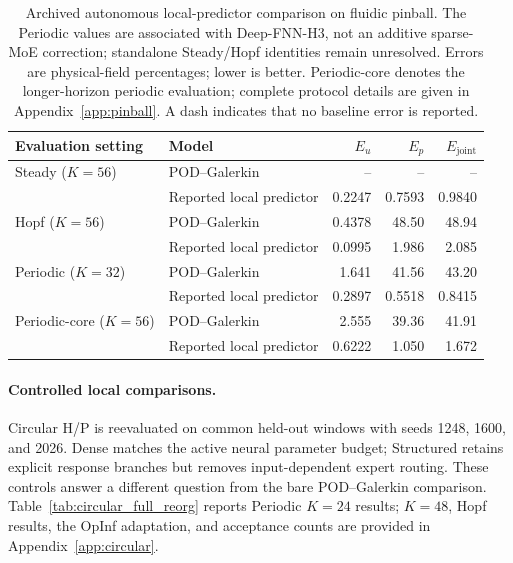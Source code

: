 \begin{table}[H]
\centering
\caption{
Archived autonomous local-predictor comparison on fluidic pinball. The Periodic values are associated with Deep-FNN-H3, not an additive sparse-MoE correction; standalone Steady/Hopf identities remain unresolved. Errors are physical-field percentages; lower is better. Periodic-core denotes the longer-horizon periodic evaluation; complete protocol details are given in Appendix~\ref{app:pinball}. A dash indicates that no baseline error is reported.
}
\label{tab:pinball_autonomous}
\small
\setlength{\tabcolsep}{5pt}
\begin{tabular}{@{}llrrr@{}}
\toprule
Evaluation setting & Model & $E_u$ & $E_p$ & $E_{\mathrm{joint}}$ \\
\midrule
Steady ($K=56$)
& POD--Galerkin
& -- & -- & -- \\
& Reported local predictor
& 0.2247 & 0.7593 & 0.9840 \\
\addlinespace

Hopf ($K=56$)
& POD--Galerkin
& 0.4378 & 48.50 & 48.94 \\
& Reported local predictor
& 0.0995 & 1.986 & 2.085 \\
\addlinespace

Periodic ($K=32$)
& POD--Galerkin
& 1.641 & 41.56 & 43.20 \\
& Reported local predictor
& 0.2897 & 0.5518 & 0.8415 \\
\addlinespace

Periodic-core ($K=56$)
& POD--Galerkin
& 2.555 & 39.36 & 41.91 \\
& Reported local predictor
& 0.6222 & 1.050 & 1.672 \\
\bottomrule
\end{tabular}
\end{table}

\paragraph{Controlled local comparisons.}
Circular H/P is reevaluated on common held-out windows with seeds
1248, 1600, and 2026. Dense matches the active neural parameter
budget; Structured retains explicit response branches but removes
input-dependent expert routing. These controls answer a different
question from the bare POD--Galerkin comparison.
Table~\ref{tab:circular_full_reorg} reports Periodic $K=24$ results;
$K=48$, Hopf results, the OpInf adaptation, and acceptance counts
are provided in Appendix~\ref{app:circular}.

